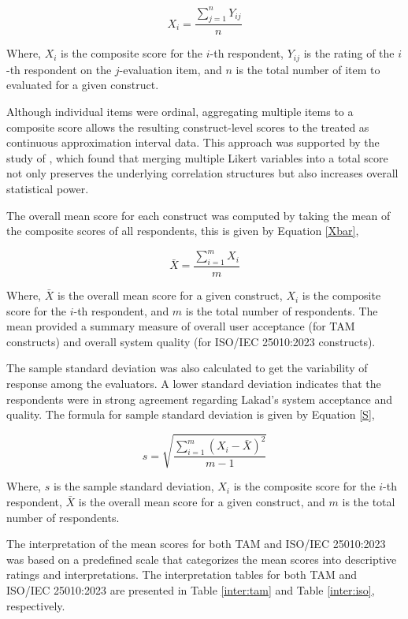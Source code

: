 \begin{equation}
	\label{Xi}
	X_i = \frac{\sum_{j=1}^{n} Y_{ij}}{n}
\end{equation}

Where, $X_{i}$ is the composite score for the $i$-th respondent, $Y_{ij}$ is the rating of the $i$-th respondent on the $j$-evaluation item, and $n$ is the total number of item to evaluated for a given construct. 

Although individual items were ordinal, aggregating multiple items to a composite score allows the resulting construct-level scores to the treated as continuous approximation interval data. This approach was supported by the study of \textcite{Huh2025}, which found that merging multiple Likert variables into a total score not only preserves the underlying correlation structures but also increases overall statistical power. 

The overall mean score for each construct was computed by taking the mean of the composite scores of all respondents, this is given by Equation \ref{Xbar},

\begin{equation}
	\label{Xbar}
	\bar{X} = \frac{\sum_{i=1}^{m} X_i}{m}
\end{equation}

Where, $\bar{X}$ is the overall mean score for a given construct, $X_i$ is the composite score for the $i$-th respondent, and $m$ is the total number of respondents. The mean provided a summary measure of overall user acceptance (for TAM constructs) and overall system quality (for ISO/IEC 25010:2023 constructs). 

The sample standard deviation was also calculated to get the variability of response among the evaluators. A lower standard deviation indicates that the respondents were in strong agreement regarding Lakad’s system acceptance and quality.  The formula for sample standard deviation is given by Equation \ref{S},

\begin{equation}
	\label{S}
	s = \sqrt{\frac{\sum_{i=1}^{m} (X_i - \bar{X})^2}{m-1}}
\end{equation}

Where, $s$ is the sample standard deviation, $X_i$ is the composite score for the $i$-th respondent, $\bar{X}$ is the overall mean score for a given construct, and $m$ is the total number of respondents.

The interpretation of the mean scores for both TAM and ISO/IEC 25010:2023 was based on a predefined scale that categorizes the mean scores into descriptive ratings and interpretations. The interpretation tables for both TAM and ISO/IEC 25010:2023 are presented in Table \ref{inter:tam} and Table \ref{inter:iso}, respectively.

